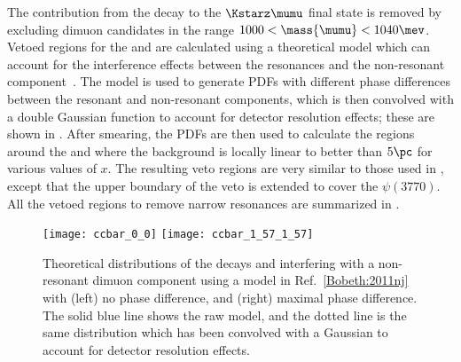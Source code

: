 The contribution from the decay \decay{\phi}{\mumu} to the $\Kstarz\mumu$ final state is removed by
excluding dimuon candidates in the range $1000<\mass{\mumu}<1040\mev$.
Vetoed regions for the \jpsi and \psitwos are calculated using a theoretical
model which can account for the interference effects between the
\decay{\ccbar}{\mumu} resonances and the non-resonant \mumu component~\cite{Bobeth:2011nj}.
The model is used to generate \glspl{PDF} with different phase differences between the resonant and
non-resonant components, which is then convolved with a double Gaussian function to account for
detector resolution effects; these are shown in .
After smearing, the \glspl{PDF} are then used to
calculate the regions around the \jpsi and \psitwos where the
background is locally linear to better than $5\pc$ for various values of $x$.
The resulting veto regions are very similar to those used in
, except that the upper boundary of the \psitwos veto is extended to cover
the $\psi(3770)$.
All the vetoed regions to remove narrow resonances are summarized in
.





\begin{figure}
  \begin{center}
    \texttt{[image: ccbar\_0\_0]}
    \texttt{[image: ccbar\_1\_57\_1\_57]}
    \caption[Theoretical distributions of \ccbar resonances interfering with a non-resonant
    component]
    {
      Theoretical distributions of the decays \jpsitomumu and \decay{\psitwos}{\mumu} interfering
      with a non-resonant dimuon component using a model in Ref.~\protect\ref{Bobeth:2011nj} with
      (left) no phase difference, and
      (right) maximal phase difference.
      The solid blue line shows the raw model, and the dotted line is the same distribution which
      has been convolved with a Gaussian to account for detector resolution effects.
    }
    \label{fig:db:ccbar}
  \end{center}
\end{figure}



